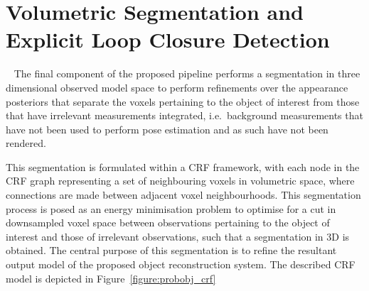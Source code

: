\section{Volumetric Segmentation and Explicit Loop Closure Detection}
~\label{sec:probobj_segmentation}
The final component of the proposed pipeline performs a segmentation in three
dimensional observed model space to perform refinements over the appearance
posteriors that separate the voxels pertaining to the object of interest from
those that have irrelevant measurements integrated, i.e.\ background measurements
that have not been used to perform pose estimation and as such have not been rendered.

This segmentation is formulated within a CRF framework, with each node in the
CRF graph representing a set of neighbouring voxels in volumetric space, where connections
are made between adjacent voxel neighbourhoods. This segmentation process is
posed as an energy minimisation problem to optimise for a cut in downsampled
voxel space between observations pertaining to the object of interest and those
of irrelevant observations, such that a segmentation in 3D is obtained. The
central purpose of this segmentation is to refine the resultant output model of
the proposed object reconstruction system. The described CRF model is depicted
in Figure~\ref{figure:probobj_crf}

